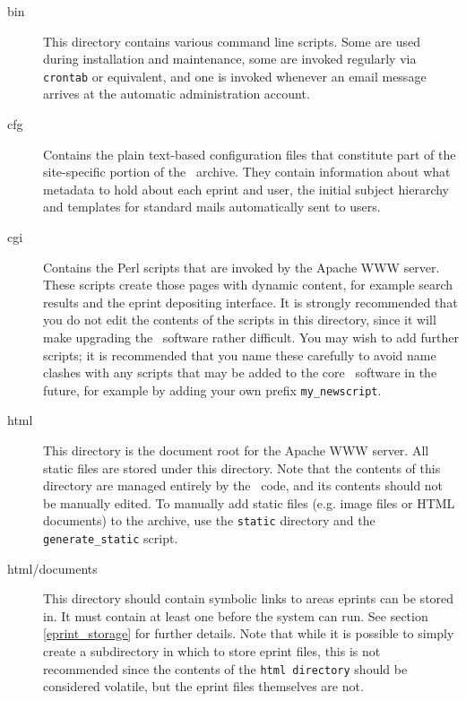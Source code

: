 \begin{description}
\item[bin]

This directory contains various command line scripts. Some are used during installation and maintenance, some are invoked regularly via {\tt crontab} or equivalent, and one is invoked whenever an email message arrives at the automatic administration account.

\item[cfg]

Contains the plain text-based configuration files that constitute part of the site-specific portion of the \eprints\ archive. They contain information about what metadata to hold about each eprint and user, the initial subject hierarchy and templates for standard mails automatically sent to users.

\item[cgi]

Contains the Perl scripts that are invoked by the Apache WWW server. These scripts create those pages with dynamic content, for example search results and the eprint depositing interface. It is strongly recommended that you do not edit the contents of the scripts in this directory, since it will make upgrading the \eprints\ software rather difficult. You may wish to add further scripts; it is recommended that you name these carefully to avoid name clashes with any scripts that may be added to the core \eprints\ software in the future, for example by adding your own prefix {\tt my\_newscript}.

\item[html]

This directory is the document root for the Apache WWW server. All static files are stored under this directory. Note that the contents of this directory are managed entirely by the \eprints\ code, and its contents should not be manually edited. To manually add static files (e.g. image files or HTML documents) to the archive, use the {\tt static} directory and the {\tt generate\_static} script.

\item[html/documents]

This directory should contain symbolic links to areas eprints can be stored in. It must contain at least one before the system can run. See section \ref{eprint_storage} for further details. Note that while it is possible to simply create a subdirectory in which to store eprint files, this is not recommended since the contents of the {\tt html directory} should be considered volatile, but the eprint files themselves are not.


\end{description}
